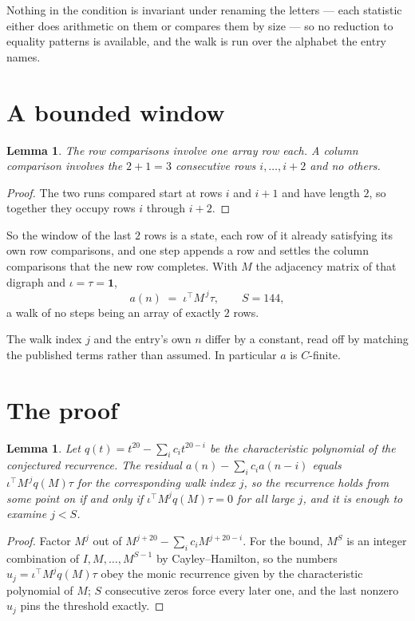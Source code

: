 \documentclass[11pt,a4paper]{article}
\theoremstyle{plain}
\newtheorem{lemma}[theorem]{Lemma}
\theoremstyle{definition}
\begin{document}
Nothing in the condition is invariant under renaming the letters --- each statistic either does
arithmetic on them or compares them by size --- so no reduction to equality patterns is
available, and the walk is run over the alphabet the entry names.

\section{A bounded window}

\begin{lemma}\label{lem:win}
The row comparisons involve one array row each. A column comparison involves the
$2+1=3$ consecutive rows $i,\dots,i{+}2$ and no others.
\end{lemma}

\begin{proof}
The two runs compared start at rows $i$ and $i+1$ and have length $2$, so together they
occupy rows $i$ through $i+2$.
\end{proof}

So the window of the last $2$ rows is a state, each row of it already satisfying its own row
comparisons, and one step appends a row and settles the column comparisons that the new row
completes. With $M$ the adjacency matrix of that digraph and $\iota=\tau=\mathbf{1}$,
\[
a(n)\;=\;\iota^{\!\top}M^{\,j}\tau ,\qquad S=144,
\]
a walk of no steps being an array of exactly $2$ rows.

The walk index $j$ and the entry's own $n$ differ by a constant, read off by matching the
published terms rather than assumed. In particular $a$ is $C$-finite.

\section{The proof}

\begin{lemma}\label{lem:crit}
Let $q(t)=t^{20}-\sum_i c_it^{20-i}$ be the characteristic polynomial of the
conjectured recurrence. The residual $a(n)-\sum_ic_ia(n-i)$ equals
$\iota^{\!\top}M^{\,j}q(M)\tau$ for the corresponding walk index $j$, so the recurrence
holds from some point on if and only if $\iota^{\!\top}M^{j}q(M)\tau=0$ for all large $j$,
and it is enough to examine $j<S$.
\end{lemma}

\begin{proof}
Factor $M^{j}$ out of $M^{j+20}-\sum_ic_iM^{j+20-i}$. For the bound, $M^{S}$
is an integer combination of $I,M,\dots,M^{S-1}$ by Cayley--Hamilton, so the numbers
$u_j=\iota^{\!\top}M^{j}q(M)\tau$ obey the monic recurrence given by the characteristic
polynomial of $M$; $S$ consecutive zeros force every later one, and the last nonzero $u_j$
pins the threshold exactly.
\end{proof}
\end{document}

